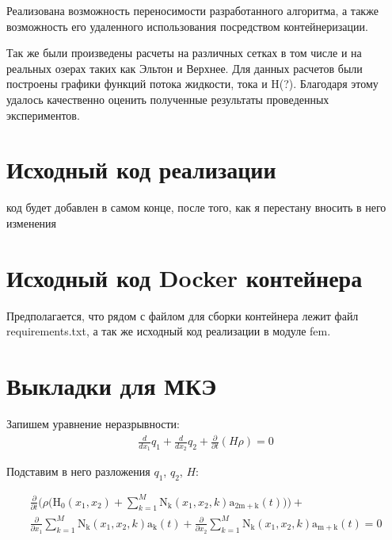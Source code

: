 \documentclass[14pt]{extreport}
\begin{document}
Реализована возможность переносимости разработанного алгоритма, а также возможность его удаленного использования посредством контейнеризации.

Так же были произведены расчеты на различных сетках в том числе и на реальных озерах таких как Эльтон и Верхнее. Для данных расчетов были построены графики функций потока жидкости, тока и H(?). Благодаря этому удалось качественно оценить полученные результаты проведенных экспериментов.






\Appendix

\chapter{Исходный код реализации}
код будет добавлен в самом конце, после того, как я перестану вносить в него изменения

\chapter{Исходный код Docker контейнера}

Предполагается, что рядом с файлом для сборки контейнера лежит файл requirements.txt, а так же исходный код реализации в модуле fem.

\begin{minipage}{\linewidth}

\end{minipage}

\begin{minipage}{\linewidth}

\end{minipage}
 
\chapter{Выкладки для МКЭ}

Запишем уравнение неразрывности:
\begin{eqnarray}
\frac{d}{d x_{1}} q_{1} + \frac{d}{d x_{2}} q_{2} + \frac{\partial}{\partial t}\left(H \rho\right) = 0
\end{eqnarray}


Подставим в него разложения $q_1$, $q_2$, $H$:

\begin{multline*}
\frac{\partial}{\partial t}\bigg(\rho \bigg(\operatorname{H_{0}}{ (x_{1},x_{2}  )}+ \sum_{k=1}^{M} \operatorname{N_{k}}{ (x_{1},x_{2},k  )} \operatorname{a_{2m+k}}{ (t  )}\bigg)\bigg) + \\\frac{\partial}{\partial x_{1}} \sum_{k=1}^{M} \operatorname{N_{k}}{ (x_{1},x_{2},k  )} \operatorname{a_{k}}{ (t  )} + \frac{\partial}{\partial x_{2}} \sum_{k=1}^{M} \operatorname{N_{k}}{ (x_{1},x_{2},k  )} \operatorname{a_{m+k}}{ (t  )} = 0
\end{multline*}
\end{document}
